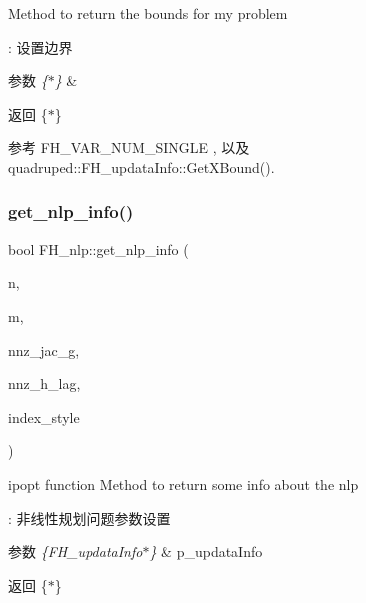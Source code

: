 Method to return the bounds for my problem

\+: 设置边界 
\begin{DoxyParams}{参数}
{\em \{$\ast$\}} & \\
\hline
\end{DoxyParams}
\begin{DoxyReturn}{返回}
\{$\ast$\} 
\end{DoxyReturn}


参考 F\+H\+\_\+\+V\+A\+R\+\_\+\+N\+U\+M\+\_\+\+S\+I\+N\+G\+LE , 以及 quadruped\+::\+F\+H\+\_\+updata\+Info\+::\+Get\+X\+Bound().

\mbox{\label{classquadruped_1_1FH__nlp_a2a7f67c823cce5ba75b8ba14a4beccfa}} 
\subsubsection{\texorpdfstring{get\+\_\+nlp\+\_\+info()}{get\_nlp\_info()}}
{\footnotesize\ttfamily bool F\+H\+\_\+nlp\+::get\+\_\+nlp\+\_\+info (\begin{DoxyParamCaption}\item[{Index \&}]{n,  }\item[{Index \&}]{m,  }\item[{Index \&}]{nnz\+\_\+jac\+\_\+g,  }\item[{Index \&}]{nnz\+\_\+h\+\_\+lag,  }\item[{Index\+Style\+Enum \&}]{index\+\_\+style }\end{DoxyParamCaption})\hspace{0.3cm}{\ttfamily [virtual]}}

ipopt function Method to return some info about the nlp

\+: 非线性规划问题参数设置 
\begin{DoxyParams}{参数}
{\em \{\+F\+H\+\_\+updata\+Info$\ast$\}} & p\+\_\+updata\+Info \\
\hline
\end{DoxyParams}
\begin{DoxyReturn}{返回}
\{$\ast$\} 
\end{DoxyReturn}
\mbox{\label{classquadruped_1_1FH__nlp_a97e90c5109ca64c20b27f767d5665df4}} 
